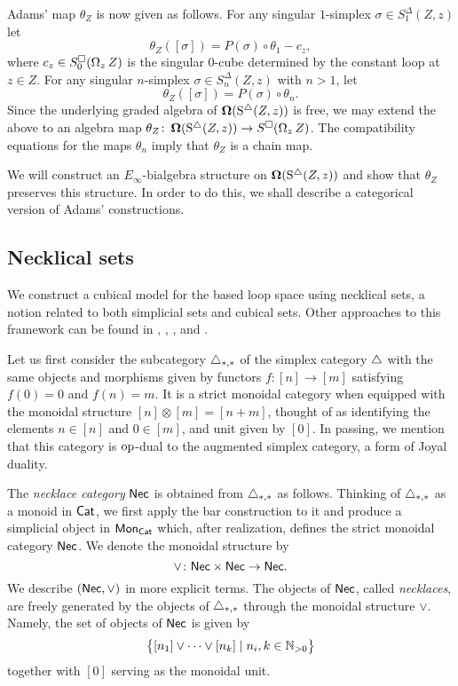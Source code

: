 Adams' map $\theta_Z$ is now given as follows.
For any singular $1$-simplex $\sigma \in S^{\Delta}_1(Z, z)$ let
\[
\theta_Z([\sigma])= P(\sigma) \circ \theta_1 - c_z,
\]
where $c_z \in S^{\square}_0(\operatorname{\Omega}_z Z)$ is the singular $0$-cube determined by the constant loop at $z \in Z.$ For any singular $n$-simplex $\sigma \in S^{\Delta}_n(Z, z)$ with $n>1$, let
\[
\theta_Z([\sigma])= P(\sigma) \circ \theta_n.
\]
Since the underlying graded algebra of $\operatorname{\mathbf{\Omega}}(\operatorname{S^{\triangle}}(Z, z))$ is free, we may extend the above to an algebra map $\theta_Z \colon \operatorname{\mathbf{\Omega}}(\operatorname{S^{\triangle}}(Z, z)) \to S^{\square}(\operatorname{\Omega}_z Z)$.
The compatibility equations for the maps $\theta_n$ imply that $\theta_Z$ is a chain map.

We will construct an $E_{\infty}$-bialgebra structure on $\operatorname{\mathbf{\Omega}}(\operatorname{S^{\triangle}}(Z, z))$ and show that $\theta_Z$ preserves this structure.
In order to do this, we shall describe a categorical version of Adams' constructions.

\subsection{Necklical sets}

We construct a cubical model for the based loop space using necklical sets, a notion related to both simplicial sets and cubical sets.
Other approaches to this framework can be found in \cite{baues1998hopf}, \cite{galvez2020hopf}, \cite{dugger2011rigidification}, and \cite{rivera2018cubical, rivera2019path}.

Let us first consider the subcategory $\triangle_{*,*}$ of the simplex category $\triangle$ with the same objects and morphisms given by functors $f \colon [n] \to [m]$ satisfying $f(0) = 0$ and $f(n) = m$.
It is a strict monoidal category when equipped with the monoidal structure $[n] \otimes [m] = [n+m]$, thought of as identifying the elements $n \in [n]$ and $0 \in [m]$, and unit given by $[0]$.
In passing, we mention that this category is $\mathrm{op}$-dual to the augmented simplex category, a form of Joyal duality.

The \textit{necklace category} $\mathsf{Nec}$ is obtained from $\triangle_{*,*}$ as follows.
Thinking of $\triangle_{*,*}$ as a monoid in $\mathsf{Cat}$, we first apply the bar construction to it and produce a simplicial object in $\mathsf{Mon}_{\mathsf{Cat}}$ which, after realization, defines the strict monoidal category $\mathsf{Nec}$. We denote the monoidal structure by 
\[\vee \colon \mathsf{Nec} \times \mathsf{Nec} \to \mathsf{Nec}.\]
We describe $(\mathsf{Nec}, \vee)$ in more explicit terms. The objects of $\mathsf{Nec}$, called \textit{necklaces}, are freely generated by the objects of $\triangle_{*,*}$ through the monoidal structure $\vee$. Namely, the set of objects of $\mathsf{Nec}$ is given by
\begin{equation*}
\big\{ [n_1] \vee \cdots \vee[n_k] \mid n_i, k \in \mathbb{N}_{>0} \big\}
\end{equation*}
together with $[0]$ serving as the monoidal unit. 

